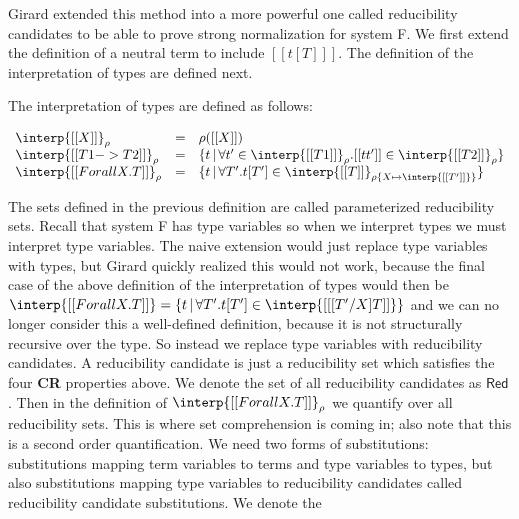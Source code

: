 Girard extended this method into a more powerful one called
reducibility candidates to be able to prove strong normalization for
system F.  We first extend the definition of a neutral term to include
$[[ t [T] ]]$.  The definition of the interpretation of
types are
defined next.
\begin{definition}
  \label{def:stlc_interpretation_taits}
  The interpretation of types are defined as follows:
  \begin{center}
    \begin{math}
      \begin{array}{lll}
        \interp{[[X]]}_\rho & = & \rho([[X]])\\
        \interp{[[T1 -> T2]]}_\rho & = & \{ t\,|\,\forall t' \in \interp{[[T1]]}_\rho.
               [[t t']] \in \interp{[[T2]]}_\rho \}\\
        \interp{[[Forall X.T]]}_\rho & = & \{ t\,|\,\forall T'.
        t[T'] \in \interp{[[T]]}_{\rho\{X \mapsto \interp{[[T']]} \}} \}
      \end{array}
    \end{math}
  \end{center}
\end{definition}
The sets defined in the previous definition are called parameterized
reducibility sets.  Recall that system F has type variables so when we
interpret types we must interpret type variables.  The naive extension
would just replace type variables with types, but Girard quickly
realized this would not work, because the final case of the above
definition of the interpretation of types would then be
$\interp{[[Forall X.T]]} = \{ t\,|\,\forall T'.  t[T'] \in \interp{[[
  [T'/X]T]]} \} $ and we can no longer consider this a well-defined
definition, because it is not structurally recursive over the type.
So instead we replace type variables with reducibility candidates.  A
reducibility candidate is just a reducibility set which satisfies the
four \textbf{CR} properties above.  We denote the set of all
reducibility candidates as $\mathsf{Red}$.  Then in the definition of
$\interp{[[Forall X.T]]}_\rho$ we quantify over all reducibility sets.
This is where set comprehension is coming in; also note that this is a
second order quantification.  We need two forms of substitutions:
substitutions mapping term variables to terms and type variables to
types, but also substitutions mapping type variables to reducibility
candidates called reducibility candidate substitutions.  We denote the
